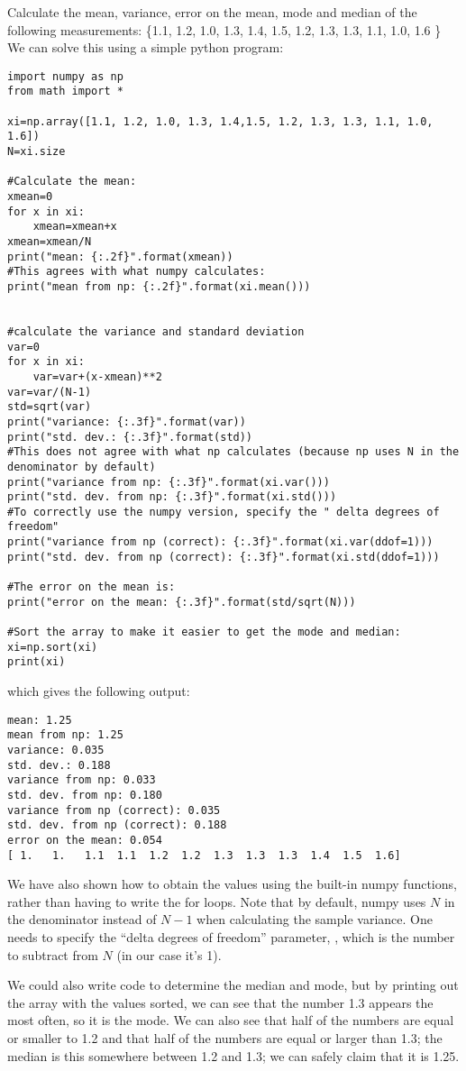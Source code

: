 \begin{example}{}{Calculate the mean, variance, error on the mean, mode and median of the following measurements: \{1.1, 1.2, 1.0, 1.3, 1.4, 1.5, 1.2, 1.3, 1.3, 1.1, 1.0, 1.6 \}}{}
\label{ex:meanvardata}
We can solve this using a simple python program:
\begin{lstlisting}[frame=single] 
import numpy as np
from math import *

xi=np.array([1.1, 1.2, 1.0, 1.3, 1.4,1.5, 1.2, 1.3, 1.3, 1.1, 1.0, 1.6])
N=xi.size

#Calculate the mean:
xmean=0
for x in xi:
    xmean=xmean+x
xmean=xmean/N
print("mean: {:.2f}".format(xmean))
#This agrees with what numpy calculates:
print("mean from np: {:.2f}".format(xi.mean()))


#calculate the variance and standard deviation
var=0
for x in xi:
    var=var+(x-xmean)**2
var=var/(N-1)
std=sqrt(var)
print("variance: {:.3f}".format(var))
print("std. dev.: {:.3f}".format(std))
#This does not agree with what np calculates (because np uses N in the denominator by default)
print("variance from np: {:.3f}".format(xi.var()))
print("std. dev. from np: {:.3f}".format(xi.std()))
#To correctly use the numpy version, specify the " delta degrees of freedom"
print("variance from np (correct): {:.3f}".format(xi.var(ddof=1)))
print("std. dev. from np (correct): {:.3f}".format(xi.std(ddof=1)))

#The error on the mean is:
print("error on the mean: {:.3f}".format(std/sqrt(N)))

#Sort the array to make it easier to get the mode and median:
xi=np.sort(xi)
print(xi)
\end{lstlisting}
which gives the following output:
\begin{verbatim}
mean: 1.25
mean from np: 1.25
variance: 0.035
std. dev.: 0.188
variance from np: 0.033
std. dev. from np: 0.180
variance from np (correct): 0.035
std. dev. from np (correct): 0.188
error on the mean: 0.054
[ 1.   1.   1.1  1.1  1.2  1.2  1.3  1.3  1.3  1.4  1.5  1.6]
\end{verbatim}

We have also shown how to obtain the values using the built-in numpy functions, rather than having to write the for loops. Note that by default, numpy uses $N$ in the denominator instead of $N-1$ when calculating the sample variance. One needs to specify the ``delta degrees of freedom'' parameter, , which is the number to subtract from $N$ (in our case it's 1).

We could also write code to determine the median and mode, but by printing out the array with the values sorted, we can see that the number 1.3 appears the most often, so it is the mode. We can also see that half of the numbers are equal or smaller to 1.2 and that half of the numbers are equal or larger than 1.3; the median is this somewhere between 1.2 and 1.3; we can safely claim that it is 1.25.


\end{example}

